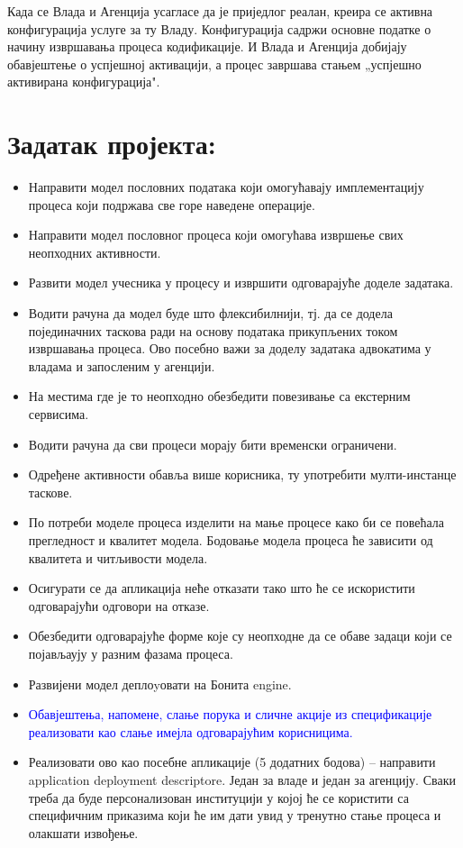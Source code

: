 \documentclass[12pt,a4paper]{article}
\newcommand{\optional}[1]{\textcolor{blue}{#1}}
\newcommand{\bonus}[1]{\textcolor{emerald}{#1}}
\begin{document}
Када се Влада и Агенција усагласе да је приједлог реалан, креира се активна конфигурација услуге за ту Владу. Конфигурација садржи основне податке о начину извршавања процеса кодификације. И Влада и Агенција добијају обавјештење о успјешној активацији, а процес завршава стањем „успјешно активирана конфигурација".

\section{Задатак пројекта:}

\begin{itemize}
    \item Направити модел пословних података који омогућавају имплементацију процеса који подржава све горе наведене операције.
    \item Направити модел пословног процеса који омогућава извршење свих неопходних активности.
    \item Развити модел учесника у процесу и извршити одговарајуће доделе задатака.
    \item Водити рачуна да модел буде што флексибилнији, тј. да се додела појединачних таскова ради на основу података прикупљених током извршавања процеса. Ово посебно важи за доделу задатака адвокатима у владама и запосленим у агенцији.
    \item На местима где је то неопходно обезбедити повезивање са екстерним сервисима.
    \item Водити рачуна да сви процеси морају бити временски ограничени.
    \item Одређене активности обавља више корисника, ту употребити мулти-инстанце таскове.
    \item По потреби моделе процеса изделити на мање процесе како би се повећала прегледност и квалитет модела. Бодовање модела процеса ће зависити од квалитета и читљивости модела.
    \item Осигурати се да апликација неће отказати тако што ће се искористити одговарајући одговори на отказе.
    \item Обезбедити одговарајуће форме које су неопходне да се обаве задаци који се појављаују у разним фазама процеса.
    \item Развијени модел деплоyовати на Бонита engine.
    \item \optional{Обавјештења, напомене, слање порука и сличне акције из спецификације реализовати као слање имејла одговарајућим корисницима.}
    \item \bonus{Реализовати ово као посебне апликације (5 додатних бодова) – направити application deployment descriptore. Један за владе и један за агенцију. Сваки треба да буде персонализован институцији у којој ће се користити са специфичним приказима који ће им дати увид у тренутно стање процеса и олакшати извођење.}
\end{itemize}
\end{document}
